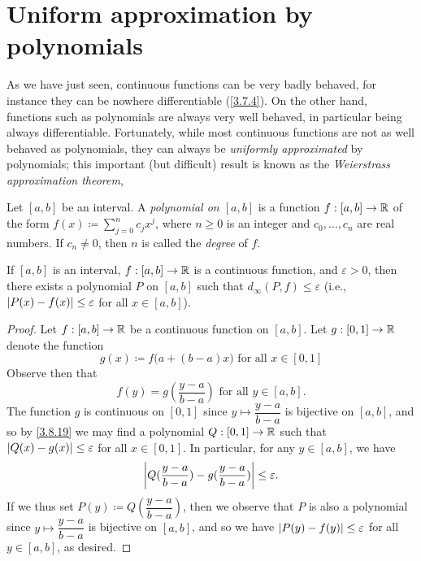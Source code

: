 \section{Uniform approximation by polynomials}\label{sec:3.8}

\begin{note}
  As we have just seen, continuous functions can be very badly behaved, for instance they can be nowhere differentiable (\cref{3.7.4}).
  On the other hand, functions such as polynomials are always very well behaved, in particular being always differentiable.
  Fortunately, while most continuous functions are not as well behaved as polynomials, they can always be \emph{uniformly approximated} by polynomials; this important (but difficult) result is known as the \emph{Weierstrass approximation theorem},
\end{note}

\begin{defn}\label{3.8.1}
  Let \([a, b]\) be an interval.
  A \emph{polynomial on \([a, b]\)} is a
  function \(f : [a, b] \to \mathbb{R}\) of the form \(f(x) \coloneqq \sum_{j = 0}^n c_j x^j\), where \(n \geq 0\) is an integer and \(c_0, \dots, c_n\) are real numbers.
  If \(c_n \neq 0\), then \(n\) is called the \emph{degree} of \(f\).
\end{defn}

\setcounter{thm}{2}
\begin{thm}\label{3.8.3}
  If \([a, b]\) is an interval, \(f : [a, b] \to \mathbb{R}\) is a continuous function, and \(\varepsilon > 0\), then there exists a polynomial \(P\) on \([a, b]\) such that \(d_\infty(P, f) \leq \varepsilon\)
  (i.e., \(\left\lvert P(x) - f(x)\right\rvert \leq \varepsilon\) for all \(x \in [a, b]\)).
\end{thm}

\begin{proof}
  Let \(f : [a, b] \to \mathbb{R}\) be a continuous function on \([a, b]\).
  Let \(g : [0, 1] \to \mathbb{R}\) denote the function
  \[
    g(x) \coloneqq f\big(a + (b - a) x\big) \text{ for all } x \in [0, 1]
  \]
  Observe then that
  \[
    f(y) = g(\dfrac{y - a}{b - a}) \text{ for all } y \in [a, b].
  \]
  The function \(g\) is continuous on \([0, 1]\) since \(y \mapsto \dfrac{y - a}{b - a}\) is bijective on \([a, b]\), and so by \cref{3.8.19} we may find a polynomial \(Q : [0, 1] \to \mathbb{R}\) such that \(\left\lvert Q(x) - g(x)\right\rvert \leq \varepsilon\) for all \(x \in [0, 1]\).
  In particular, for any \(y \in [a, b]\), we have
  \[
    \left\lvert Q(\dfrac{y - a}{b - a}) - g(\dfrac{y - a}{b - a})\right\rvert \leq \varepsilon.
  \]
  If we thus set \(P(y) \coloneqq Q(\dfrac{y - a}{b - a})\), then we observe that \(P\) is also a polynomial since \(y \mapsto \dfrac{y - a}{b - a}\) is bijective on \([a, b]\), and so we have \(\left\lvert P(y) - f(y)\right\rvert \leq \varepsilon\) for all \(y \in [a, b]\), as desired.
\end{proof}

